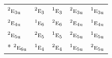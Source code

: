 \documentclass[10pt,a4paper]{article}
\numberwithin{equation}{section}
\newcommand{\irr}[1]{\text{\normalfont\scshape #1}}
\newcommand{\conjpair}[1]{{}^{#1}}
\newcommand{\ptag}[1]{\mathrm{#1}}
\begin{document}
{\begin{longtable}{@{}lcccc@{}}
$\conjpair{2}\irr{e}_{3\ptag{u}}$ & $\conjpair{2}\irr{e}_{3}$ & $\conjpair{1}\irr{e}_{3}$ & $\conjpair{2}\irr{e}_{3\ptag{u}}$ & $\conjpair{1}\irr{e}_{3\ptag{u}}$\\
$\conjpair{2}\irr{e}_{4\ptag{u}}$ & $\conjpair{1}\irr{e}_{6}$ & $\conjpair{2}\irr{e}_{6}$ & $\conjpair{2}\irr{e}_{4\ptag{u}}$ & $\conjpair{1}\irr{e}_{4\ptag{u}}$\\
$\conjpair{2}\irr{e}_{5\ptag{u}}$ & $\conjpair{2}\irr{e}_{5}$ & $\conjpair{1}\irr{e}_{5}$ & $\conjpair{2}\irr{e}_{5\ptag{u}}$ & $\conjpair{1}\irr{e}_{5\ptag{u}}$\\*
$\conjpair{2}\irr{e}_{6\ptag{u}}$ & $\conjpair{1}\irr{e}_{4}$ & $\conjpair{2}\irr{e}_{4}$ & $\conjpair{1}\irr{e}_{5\ptag{u}}$ & $\conjpair{2}\irr{e}_{5\ptag{u}}$\\
\bottomrule\end{longtable}}
\end{document}
